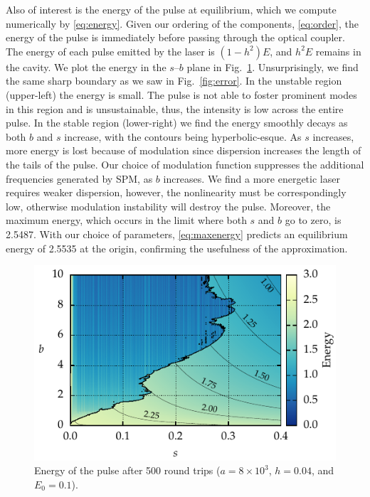 \documentclass[9pt,twocolumn,twoside]{osajnl}
\begin{document}
Also of interest is the energy of the pulse at equilibrium, which we compute numerically by \eqref{eq:energy}. Given our ordering of the components, \eqref{eq:order}, the energy of the pulse is immediately before passing through the optical coupler. The energy of each pulse emitted by the laser is $(1 - h^2) E$, and $h^2 E$ remains in the cavity. We plot the energy in the $s$--$b$ plane in Fig.~\ref{fig:energy}. Unsurprisingly, we find the same sharp boundary as we saw in Fig.~\ref{fig:error}. In the unstable region (upper-left) the energy is small. The pulse is not able to foster prominent modes in this region and is unsustainable, thus, the intensity is low across the entire pulse. In the stable region (lower-right) we find the energy smoothly decays as both $b$ and $s$ increase, with the contours being hyperbolic-esque. As $s$ increases, more energy is lost because of modulation since dispersion increases the length of the tails of the pulse. Our choice of modulation function suppresses the additional frequencies generated by SPM, as $b$ increases. We find a more energetic laser requires weaker dispersion, however, the nonlinearity must be correspondingly low, otherwise modulation instability will destroy the pulse. Moreover, the maximum energy, which occurs in the limit where both $s$ and $b$ go to zero, is 2.5487. With our choice of parameters, \eqref{eq:maxenergy} predicts an equilibrium energy of 2.5535 at the origin, confirming the usefulness of the approximation.

\begin{figure}[tbp]
	\centering
	\includegraphics{Figures/ParamSpaceEnergy}
	\caption{Energy of the pulse after 500 round trips ($a = 8 \times 10^3$, $h = 0.04$, and $E_0 = 0.1$).}
	\label{fig:energy}
\end{figure}
\end{document}
